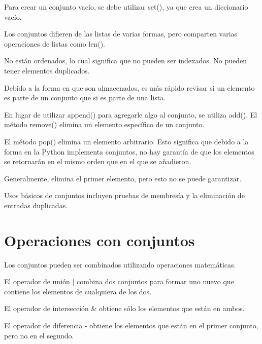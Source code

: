 \documentclass{report}
\begin{document}

Para crear un conjunto vacío, se debe utilizar set(), ya que {} crea un diccionario vacío.


Los conjuntos difieren de las listas de varias formas, pero comparten varias operaciones de listas como len().

No están ordenados, lo cual significa que no pueden ser indexados. No pueden tener elementos duplicados.

Debido a la forma en que son almacenados, es más rápido revisar si un elemento es parte de un conjunto que si es parte de una lista.

En lugar de utilizar append() para agregarle algo al conjunto, se utiliza add(). El método remove() elimina un elemento específico de un conjunto.


El método pop() elimina un elemento arbitrario. Esto significa que debido a la forma en la Python implementa conjuntos, no hay garantía de que los elementos se retornarán en el mismo orden que en el que se añadieron.

Generalmente, elimina el primer elemento, pero esto no se puede garantizar.


Usos básicos de conjuntos incluyen pruebas de membresía y la eliminación de entradas duplicadas.

\section{Operaciones con conjuntos}

Los conjuntos pueden ser combinados utilizando operaciones matemáticas.

El operador de unión | combina dos conjuntos para formar uno nuevo que contiene los elementos de cualquiera de los dos.


El operador de intersección \& obtiene sólo los elementos que están en ambos.


El operador de diferencia - obtiene los elementos que están en el primer conjunto, pero no en el segundo.
\end{document}
